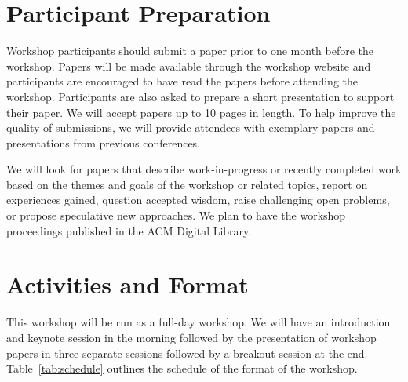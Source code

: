 \documentclass{sigplanconf}
\begin{document}
\section{Participant Preparation}\label{preparation}

Workshop participants should submit a paper prior to one
month before the workshop. Papers will be made available
through the workshop website and participants are encouraged to have
read the papers before attending the workshop. Participants
are also asked to prepare a short presentation to support their
paper. We will accept papers up to 10 pages in length.
To help improve the quality of submissions, 
we will provide attendees with exemplary papers and presentations
from previous conferences.

\vfill\eject

We will look for papers that describe work-in-progress or recently completed work based on the themes and goals of the workshop or related topics, report on experiences gained, question accepted wisdom, raise challenging open problems, or propose
speculative new approaches. We plan to have the workshop proceedings published in the ACM Digital Library.

\section{Activities and Format}

This workshop will be run as a full-day workshop.  We
will have an introduction and keynote session in the morning followed
by the presentation of workshop papers in three separate sessions followed 
by a breakout session at the end. 
Table~\ref{tab:schedule} outlines the schedule of the format of the workshop.
\end{document}
